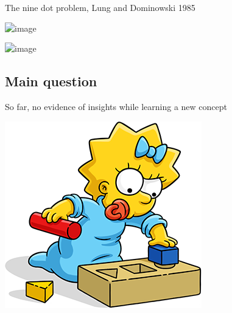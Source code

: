 \documentclass[11pt]{beamer}
\newcommand{\ig}{\includegraphics}
\begin{document}







 \begin{frame}

   \centering


    \footnotesize{The nine dot problem, Lung and  Dominowski 1985}
   
   \ig[scale=0.4]{nine.png}


   \end{frame}
        \begin{frame}
          \centering
          
          \ig[scale=0.10]{solution.png}

         
          
        \end{frame}


        \subsection{Main question}           
                  


        
                \begin{frame}

                  So far, no evidence of insights while learning a new  concept
                  \bigskip

                  \centering
                  \includegraphics[scale=0.8]{maggie_maths.png}
                  
                \end{frame}
\end{document}
